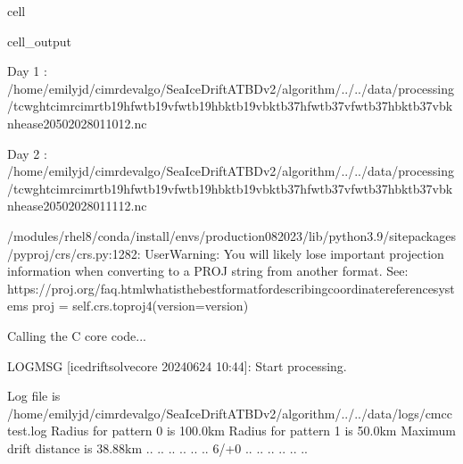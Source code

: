 \documentclass[letterpaper,10pt,english]{jupyterBook}
\begin{document}
\begin{sphinxuseclass}{cell}
\begin{sphinxVerbatimOutput}
\begin{sphinxuseclass}{cell_output}
\begin{sphinxVerbatim}[commandchars=\\\{\}]
	Day 1 : /home/emilyjd/cimr\PYGZhy{}devalgo/SeaIceDrift\PYGZus{}ATBD\PYGZus{}v2/algorithm/../../data/processing/tc\PYGZus{}wght\PYGZus{}cimr\PYGZhy{}cimr\PYGZus{}tb19hfw\PYGZhy{}tb19vfw\PYGZhy{}tb19hbk\PYGZhy{}tb19vbk\PYGZhy{}tb37hfw\PYGZhy{}tb37vfw\PYGZhy{}tb37hbk\PYGZhy{}tb37vbk\PYGZus{}nh\PYGZhy{}ease2\PYGZhy{}050\PYGZus{}2028011012.nc 

	Day 2 : /home/emilyjd/cimr\PYGZhy{}devalgo/SeaIceDrift\PYGZus{}ATBD\PYGZus{}v2/algorithm/../../data/processing/tc\PYGZus{}wght\PYGZus{}cimr\PYGZhy{}cimr\PYGZus{}tb19hfw\PYGZhy{}tb19vfw\PYGZhy{}tb19hbk\PYGZhy{}tb19vbk\PYGZhy{}tb37hfw\PYGZhy{}tb37vfw\PYGZhy{}tb37hbk\PYGZhy{}tb37vbk\PYGZus{}nh\PYGZhy{}ease2\PYGZhy{}050\PYGZus{}2028011112.nc 
\end{sphinxVerbatim}

\begin{sphinxVerbatim}[commandchars=\\\{\}]
/modules/rhel8/conda/install/envs/production\PYGZhy{}08\PYGZhy{}2023/lib/python3.9/site\PYGZhy{}packages/pyproj/crs/crs.py:1282: UserWarning: You will likely lose important projection information when converting to a PROJ string from another format. See: https://proj.org/faq.html\PYGZsh{}what\PYGZhy{}is\PYGZhy{}the\PYGZhy{}best\PYGZhy{}format\PYGZhy{}for\PYGZhy{}describing\PYGZhy{}coordinate\PYGZhy{}reference\PYGZhy{}systems
  proj = self.\PYGZus{}crs.to\PYGZus{}proj4(version=version)
\end{sphinxVerbatim}

\begin{sphinxVerbatim}[commandchars=\\\{\}]
Calling the C core code...
 
 LOGMSG [icedrift\PYGZus{}solve\PYGZus{}core 2024\PYGZhy{}06\PYGZhy{}24 10:44]:
	Start processing.
 
	Log file is \PYGZlt{}/home/emilyjd/cimr\PYGZhy{}devalgo/SeaIceDrift\PYGZus{}ATBD\PYGZus{}v2/algorithm/../../data/logs/cmcc\PYGZhy{}test.log\PYGZgt{}
	Radius for pattern \PYGZsh{}0 is 100.0km
	Radius for pattern \PYGZsh{}1 is 50.0km
	Maximum drift distance is 38.88km
 .\PYGZus{}\PYGZus{}\PYGZus{}\PYGZus{}\PYGZus{}. .\PYGZus{}\PYGZus{}\PYGZus{}\PYGZus{}\PYGZus{}. .\PYGZus{}\PYGZus{}\PYGZus{}\PYGZus{}\PYGZus{}. .\PYGZus{}\PYGZus{}\PYGZus{}\PYGZus{}\PYGZus{}. .\PYGZus{}\PYGZus{}\PYGZus{}\PYGZus{}\PYGZus{}. .\PYGZus{}\PYGZus{}\PYGZus{}\PYGZus{}\PYGZus{}. \PYGZob{}\PYGZhy{}6/+0\PYGZcb{} .\PYGZus{}\PYGZus{}\PYGZus{}\PYGZus{}\PYGZus{}. .\PYGZus{}\PYGZus{}\PYGZus{}\PYGZus{}\PYGZus{}. .\PYGZus{}\PYGZus{}\PYGZus{}\PYGZus{}\PYGZus{}. .\PYGZus{}\PYGZus{}\PYGZus{}\PYGZus{}\PYGZus{}. .\PYGZus{}\PYGZus{}\PYGZus{}\PYGZus{}\PYGZus{}. .\PYGZus{}\PYGZus{}\PYGZus{}\PYGZus{}\PYGZus{}. 




\end{sphinxVerbatim}
\end{sphinxuseclass}
\end{sphinxVerbatimOutput}
\end{sphinxuseclass}
\end{document}
